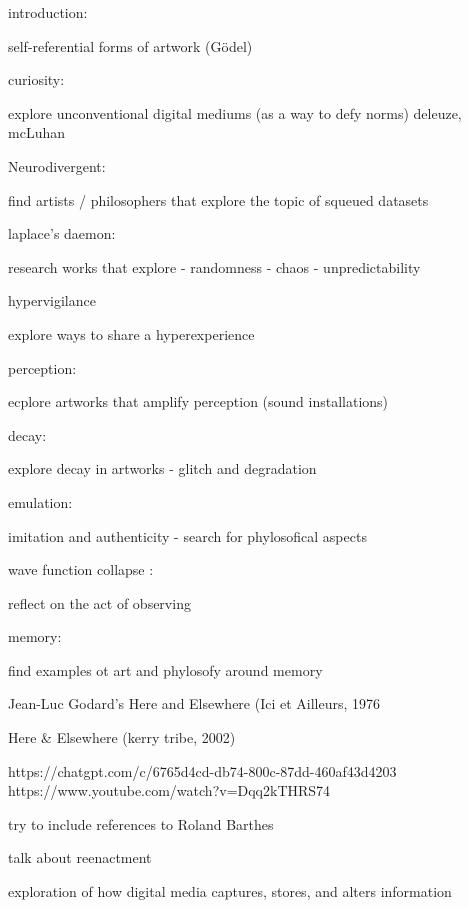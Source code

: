 


introduction:

self-referential forms of artwork
(Gödel)

curiosity:

explore unconventional digital mediums (as a way to defy norms)
deleuze, mcLuhan

Neurodivergent:

find artists / philosophers that explore the topic of squeued datasets 


laplace's daemon:

research works that explore 
- randomness 
- chaos 
- unpredictability 



hypervigilance

explore ways to share a hyperexperience
 

perception:

ecplore artworks that amplify perception 
(sound installations)

decay:

explore decay in artworks 
 - glitch and degradation 


 emulation:

 imitation and authenticity -   search for phylosofical aspects 


 wave function collapse : 

 reflect on the act of observing


 memory: 

 find examples ot art and phylosofy around memory 

 Jean-Luc Godard’s Here and Elsewhere (Ici et Ailleurs, 1976

 Here & Elsewhere (kerry tribe, 2002)

 https://chatgpt.com/c/6765d4cd-db74-800c-87dd-460af43d4203
 https://www.youtube.com/watch?v=Dqq2kTHRS74


try to include references  to Roland Barthes

talk about reenactment 

exploration of how digital media captures, stores, and alters information